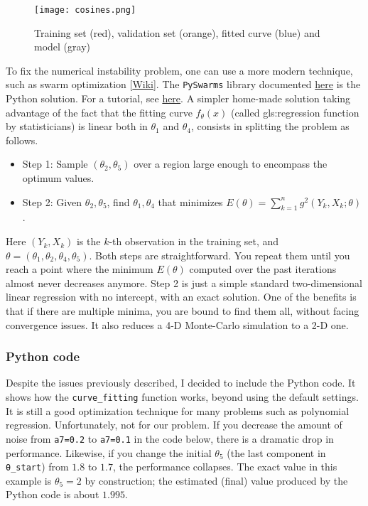 \documentclass[oneside,10pt]{book}
\begin{document}
\begin{figure}[H]
\centering
\texttt{[image: cosines.png]}
\caption{Training set (red), validation set (orange), fitted curve (blue) and model (gray)}
\label{fig:pyplot1}
\end{figure}

To fix the numerical instability problem, one can use a more modern technique, such as \textcolor{index}{swarm optimization} [\href{https://en.wikipedia.org/wiki/Particle_swarm_optimization}{Wiki}]. The \texttt{PySwarms} library documented \href{https://pyswarms.readthedocs.io/en/latest/}{here}
 is the Python solution. For a tutorial, see
 \href{https://machinelearningmastery.com/a-gentle-introduction-to-particle-swarm-optimization/}{here}. A simpler home-made solution taking
advantage of the fact that the fitting curve $f_\theta(x)$ (called \gls{gls:regression} function by statisticians) is linear both in $\theta_1$ and
 $\theta_4$,  consists in splitting the problem as follows.

\begin{itemize}
\item Step 1: Sample $(\theta_2,\theta_5)$ over a region large enough to encompass the optimum values.
\item Step 2:  Given $\theta_2,\theta_5$, find $\theta_1,\theta_4$ that minimizes $E(\theta)=\sum_{k=1}^n g^2(Y_k,X_k;\theta)$.
\end{itemize}
Here $(Y_k,X_k)$ is the $k$-th observation in the training set, and $\theta=(\theta_1,\theta_2, \theta_4,\theta_5)$. Both steps are straightforward.
You repeat them until you reach a point where the minimum $E(\theta)$ computed over the past iterations almost never decreases anymore. Step 2 is just a simple standard two-dimensional linear regression with no intercept, with an exact solution. One of the benefits is that if there are
 multiple minima, you are bound to find them all, without facing convergence issues. It also reduces a 4-D Monte-Carlo simulation to a 2-D one.



\subsubsection{Python code}\label{poihgf}

Despite the issues previously described, I decided to include the Python code. It shows how the \texttt{curve\_fitting} function works, beyond using the default settings.
 It is still a good optimization technique for many problems such as polynomial regression. Unfortunately, not for our problem. If you decrease
 the amount of noise from \texttt{a7=0.2} to \texttt{a7=0.1} in the code below, there is a dramatic drop in performance. Likewise, if you change the  initial $\theta_5$ (the last component in  \texttt{\textcolor{gray2}{θ}\_start})
  from
$1.8$ to $1.7$, the performance collapses. The exact value in this example is $\theta_5=2$ by construction; the estimated
 (final) value produced by the Python code is about $1.995$.
\end{document}
